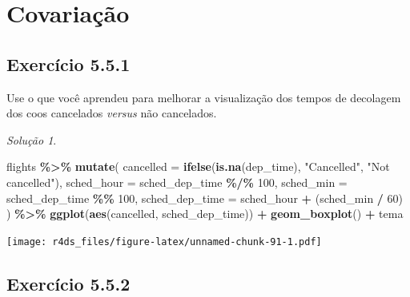 \documentclass[
]{latex/krantz}
\newenvironment{Shaded}{\begin{snugshade}}{\end{snugshade}}
\newcommand{\AttributeTok}[1]{\textcolor[rgb]{0.13,0.29,0.53}{#1}}
\newcommand{\DecValTok}[1]{\textcolor[rgb]{0.00,0.00,0.81}{#1}}
\newcommand{\FunctionTok}[1]{\textcolor[rgb]{0.13,0.29,0.53}{\textbf{#1}}}
\newcommand{\NormalTok}[1]{#1}
\newcommand{\SpecialCharTok}[1]{\textcolor[rgb]{0.81,0.36,0.00}{\textbf{#1}}}
\newcommand{\StringTok}[1]{\textcolor[rgb]{0.31,0.60,0.02}{#1}}
\theoremstyle{definition}
\theoremstyle{definition}
\theoremstyle{definition}
\theoremstyle{definition}
\theoremstyle{remark}
\newtheorem*{solution}{Solução}
\begin{document}
\hypertarget{covariauxe7uxe3o}{%
\section{Covariação}\label{covariauxe7uxe3o}}

\hypertarget{exr5-5-1}{%
\subsection*{Exercício 5.5.1}\label{exr5-5-1}}

Use o que você aprendeu para melhorar a visualização dos tempos de decolagem dos coos cancelados \emph{versus} não cancelados.

\begin{solution}
\leavevmode

\begin{Shaded}
\begin{Highlighting}[]
\NormalTok{flights }\SpecialCharTok{\%\textgreater{}\%}
    \FunctionTok{mutate}\NormalTok{(}
        \AttributeTok{cancelled =} \FunctionTok{ifelse}\NormalTok{(}\FunctionTok{is.na}\NormalTok{(dep\_time), }\StringTok{"Cancelled"}\NormalTok{, }\StringTok{"Not cancelled"}\NormalTok{),}
        \AttributeTok{sched\_hour =}\NormalTok{ sched\_dep\_time }\SpecialCharTok{\%/\%} \DecValTok{100}\NormalTok{,}
        \AttributeTok{sched\_min =}\NormalTok{ sched\_dep\_time }\SpecialCharTok{\%\%} \DecValTok{100}\NormalTok{,}
        \AttributeTok{sched\_dep\_time =}\NormalTok{ sched\_hour }\SpecialCharTok{+}\NormalTok{ (sched\_min }\SpecialCharTok{/} \DecValTok{60}\NormalTok{)}
\NormalTok{    ) }\SpecialCharTok{\%\textgreater{}\%}    
    \FunctionTok{ggplot}\NormalTok{(}\FunctionTok{aes}\NormalTok{(cancelled, sched\_dep\_time)) }\SpecialCharTok{+}
        \FunctionTok{geom\_boxplot}\NormalTok{() }\SpecialCharTok{+}
\NormalTok{        tema}
\end{Highlighting}
\end{Shaded}

\texttt{[image: r4ds\_files/figure-latex/unnamed-chunk-91-1.pdf]}

\end{solution}

\hypertarget{exr5-5-2}{%
\subsection*{Exercício 5.5.2}\label{exr5-5-2}}
\end{document}
